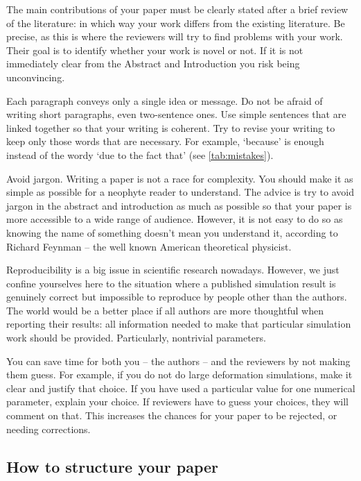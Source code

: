 \documentclass[authoryear,3p,times,preprint,review,fleqn]{elsarticle}
\numberwithin{equation}{section}
\theoremstyle{remark}
\begin{document}
The main contributions of your paper must be clearly stated after a brief review of the literature: in which way your work differs from the existing literature. Be precise, as this is where the reviewers will try to find problems with your work. Their goal is to identify whether your work is novel or not. If it is not immediately clear from the Abstract and Introduction you risk being unconvincing. 

Each paragraph conveys only a single idea or message. Do not be afraid of writing short paragraphs, even two-sentence ones. 
Use simple sentences that are linked together so that your writing is coherent. Try to revise your writing to keep only those words that are necessary. For example, `because' is enough instead of the wordy `due to the fact that' (see \cref{tab:mistakes}).

Avoid jargon.  Writing a paper is not a race for complexity. You should make it as simple as possible for a neophyte reader to understand.
The advice is try to avoid jargon in the abstract and introduction as much as possible so that your paper is more accessible to a wide range of audience. However, it is not easy to do so as knowing the name of something doesn’t mean you understand it, according to Richard Feynman -- the well known American theoretical physicist.

Reproducibility is a big issue in scientific research nowadays. However, we just confine yourselves here to the situation where a published simulation result is genuinely correct but impossible to reproduce by people other than the authors. The world would be a better place if all authors are more thoughtful when reporting their results: all information needed to make that particular simulation work should be provided. Particularly, nontrivial parameters.

You can save time for both you -- the authors -- and the reviewers by not making them guess. For example, if you do not do large deformation simulations, make it clear and justify that choice. If you have used a particular value for one numerical parameter, explain your choice. If reviewers have to guess your choices, they will comment on that. This increases the chances for your paper to be rejected, or needing corrections.




\subsection{How to structure your paper}\label{structure}
\end{document}
